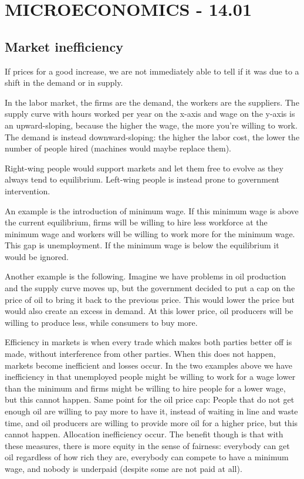 \chapter{MICROECONOMICS - 14.01}

\section{Market inefficiency}
If prices for a good increase, we are not immediately able to tell if it was due to a shift in the demand or in supply. 

In the labor market, the firms are the demand, the workers are the suppliers. The supply curve with hours worked per year on the x-axis and wage on the y-axis is an upward-sloping, because the higher the wage, the more you're willing to work. The demand is instead downward-sloping: the higher the labor cost, the lower the number of people hired (machines would maybe replace them).

Right-wing people would support markets and let them free to evolve as they always tend to equilibrium. Left-wing people is instead prone to government intervention. 

An example is the introduction of minimum wage. If this minimum wage is above the current equilibrium, firms will be willing to hire less workforce at the minimum wage and workers will be willing to work more for the minimum wage. This gap is unemployment. If the minimum wage is below the equilibrium it would be ignored.

Another example is the following. Imagine we have problems in oil production and the supply curve moves up, but the government decided to put a cap on the price of oil to bring it back to the previous price. This would lower the price but would also create an excess in demand. At this lower price, oil producers will be willing to produce less, while consumers to buy more.

Efficiency in markets is when every trade which makes both parties better off is made, without interference from other parties. When this does not happen, markets become inefficient and losses occur. In the two examples above we have inefficiency in that unemployed people might be willing to work for a wage lower than the minimum and firms might be willing to hire people for a lower wage, but this cannot happen. Same point for the oil price cap: People that do not get enough oil are willing to pay more to have it, instead of waiting in line and waste time, and oil producers are willing to provide more oil for a higher price, but this cannot happen. Allocation inefficiency occur. The benefit though is that with these measures, there is more equity in the sense of fairness: everybody can get oil regardless of how rich they are, everybody can compete to have a minimum wage, and nobody is underpaid (despite some are not paid at all).


